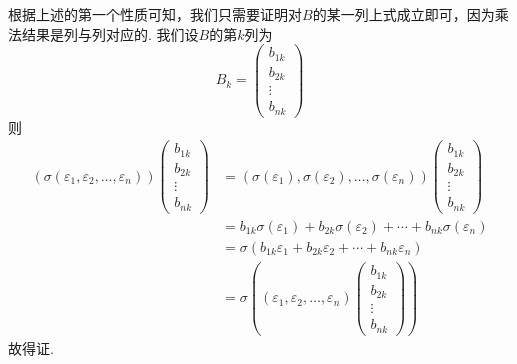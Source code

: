 \begin{enumerate}
          根据上述的第一个性质可知，我们只需要证明对$B$的某一列上式成立即可，因为乘法结果是列与列对应的. 我们设$B$的第$k$列为
          \[B_k=\begin{pmatrix}
                  b_{1k} \\ b_{2k} \\ \vdots \\ b_{nk}
              \end{pmatrix}\]
          则
          \begin{align*}
              (\sigma(\varepsilon_1,\varepsilon_2,\ldots,\varepsilon_n))\begin{pmatrix}
                                                                            b_{1k} \\ b_{2k} \\ \vdots \\ b_{nk}
                                                                        \end{pmatrix}
               & =(\sigma(\varepsilon_1),\sigma(\varepsilon_2),\ldots,\sigma(\varepsilon_n))\begin{pmatrix}
                                                                                                b_{1k} \\ b_{2k} \\ \vdots \\ b_{nk}
                                                                                            \end{pmatrix} \\
               & =b_{1k}\sigma(\varepsilon_1)+b_{2k}\sigma(\varepsilon_2)+\cdots+b_{nk}\sigma(\varepsilon_n)                     \\
               & =\sigma(b_{1k}\varepsilon_1+b_{2k}\varepsilon_2+\cdots+b_{nk}\varepsilon_n)                                     \\
               & =\sigma((\varepsilon_1,\varepsilon_2,\ldots,\varepsilon_n)\begin{pmatrix}
                                                                               b_{1k} \\ b_{2k} \\ \vdots \\ b_{nk}
                                                                           \end{pmatrix})
          \end{align*}
          故得证.
\end{enumerate}

